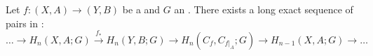 \begin{theorem} \label{theorem:long_exact_sequence_for_mapping_cone_of_pairs_for_singular_homology}
Let $f: (X, A) \to (Y, B)$ be a  and $G$ an . There exists a long exact sequence of pairs in :
$$ \dots \to H_n(X, A; G) \xrightarrow{f_*} H_n(Y, B; G) \to H_n(C_f, C_{f|_A}; G) \to H_{n-1}(X, A; G) \to \dots $$
\end{theorem}